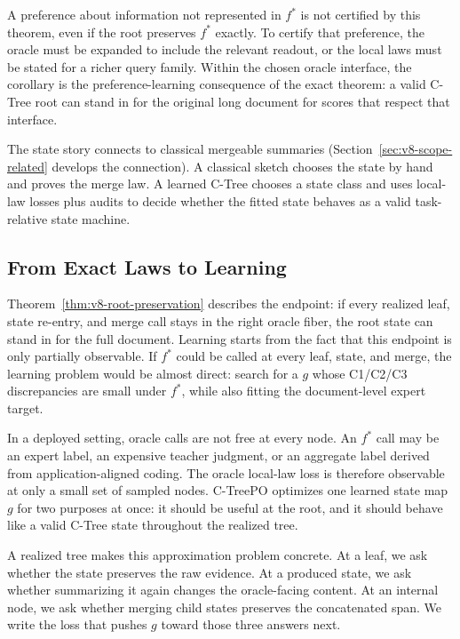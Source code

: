 A preference about information not represented in \(f^\ast\) is not
certified by this theorem, even if the root preserves \(f^\ast\)
exactly. To certify that preference, the oracle must be expanded to
include the relevant readout, or the local laws must be stated for a
richer query family. Within the chosen oracle interface, the
corollary is the preference-learning consequence of the exact
theorem: a valid C-Tree root can stand in for the original long
document for scores that respect that interface.

The state story connects to classical mergeable summaries
(Section~\ref{sec:v8-scope-related} develops the connection). A
classical sketch chooses the state by hand and proves the merge law.
A learned C-Tree chooses a state class and uses local-law losses
plus audits to decide whether the fitted state behaves as a valid
task-relative state machine.

\subsection{From Exact Laws to Learning}

Theorem~\ref{thm:v8-root-preservation} describes the endpoint: if
every realized leaf, state re-entry, and merge call stays in the
right oracle fiber, the root state can stand in for the full
document. Learning starts from the fact that this endpoint is
only partially observable. If \(f^\ast\) could be called at every leaf, state,
and merge, the learning problem would be almost direct: search
for a \(g\) whose C1/C2/C3 discrepancies are small under
\(f^\ast\), while also fitting the document-level expert target.

In a deployed setting, oracle calls are not free at every node. An
\(f^\ast\) call may be an expert label, an expensive teacher
judgment, or an aggregate label derived from application-aligned
coding. The oracle local-law loss is therefore observable at only a
small set of sampled nodes. C-TreePO optimizes one learned state
map \(g\) for two purposes at once: it should be useful at the
root, and it should behave like a valid C-Tree state throughout the
realized tree.

A realized tree makes this approximation problem concrete. At a
leaf, we ask whether the state preserves the raw evidence. At a
produced state, we ask whether summarizing it again changes the
oracle-facing content. At an internal node, we ask whether merging
child states preserves the concatenated span. We write the loss
that pushes \(g\) toward those three answers next.
